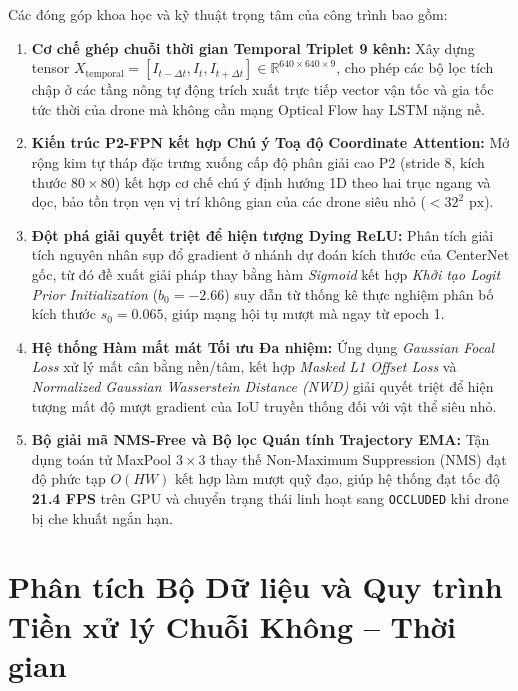 \documentclass[11pt,a4paper]{article}
\begin{document}
Các đóng góp khoa học và kỹ thuật trọng tâm của công trình bao gồm:
\begin{enumerate}
    \item \textbf{Cơ chế ghép chuỗi thời gian Temporal Triplet 9 kênh:} Xây dựng tensor $X_{\text{temporal}} = [I_{t - \Delta t}, I_t, I_{t + \Delta t}] \in \mathbb{R}^{640 \times 640 \times 9}$, cho phép các bộ lọc tích chập ở các tầng nông tự động trích xuất trực tiếp vector vận tốc và gia tốc tức thời của drone mà không cần mạng Optical Flow hay LSTM nặng nề.
    \item \textbf{Kiến trúc P2-FPN kết hợp Chú ý Toạ độ Coordinate Attention:} Mở rộng kim tự tháp đặc trưng xuống cấp độ phân giải cao P2 (stride 8, kích thước $80 \times 80$) kết hợp cơ chế chú ý định hướng 1D theo hai trục ngang và dọc, bảo tồn trọn vẹn vị trí không gian của các drone siêu nhỏ ($< 32^2\text{ px}$).
    \item \textbf{Đột phá giải quyết triệt để hiện tượng Dying ReLU:} Phân tích giải tích nguyên nhân sụp đổ gradient ở nhánh dự đoán kích thước của CenterNet gốc, từ đó đề xuất giải pháp thay bằng hàm \textit{Sigmoid} kết hợp \textit{Khởi tạo Logit Prior Initialization} ($b_0 = -2.66$) suy dẫn từ thống kê thực nghiệm phân bố kích thước $s_0 = 0.065$, giúp mạng hội tụ mượt mà ngay từ epoch 1.
    \item \textbf{Hệ thống Hàm mất mát Tối ưu Đa nhiệm:} Ứng dụng \textit{Gaussian Focal Loss} xử lý mất cân bằng nền/tâm, kết hợp \textit{Masked L1 Offset Loss} và \textit{Normalized Gaussian Wasserstein Distance (NWD)} giải quyết triệt để hiện tượng mất độ mượt gradient của IoU truyền thống đối với vật thể siêu nhỏ.
    \item \textbf{Bộ giải mã NMS-Free và Bộ lọc Quán tính Trajectory EMA:} Tận dụng toán tử MaxPool $3 \times 3$ thay thế Non-Maximum Suppression (NMS) đạt độ phức tạp $O(HW)$ kết hợp làm mượt quỹ đạo, giúp hệ thống đạt tốc độ \textbf{21.4 FPS} trên GPU và chuyển trạng thái linh hoạt sang \texttt{OCCLUDED} khi drone bị che khuất ngắn hạn.
\end{enumerate}

\section{Phân tích Bộ Dữ liệu và Quy trình Tiền xử lý Chuỗi Không -- Thời gian}
\end{document}
